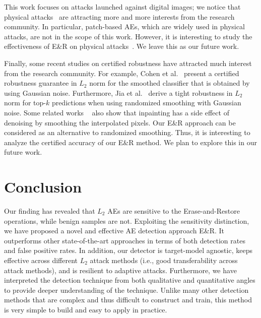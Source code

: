 \documentclass[sigconf]{acmart}
\begin{document}
This work focuses on attacks launched against digital images; we notice that physical attacks~\cite{eykholt2018robust, song2018physical} are attracting more and more interests from the research community. In particular, patch-based AEs, which are widely used in physical attacks, are not in the scope of this work. However, it is interesting to study the effectiveness of E\&R on  physical attacks~\cite{eykholt2018robust}. We leave this as our future work.

Finally, some recent studies on certified robustness have attracted much interest from the research community. For example, Cohen et al.~\cite{cohen2019certified} present 
a certified
robustness guarantee in $L_2$ norm for the smoothed classifier 
that is obtained by using Gaussian noise. Furthermore, Jia et al.~\cite{jia2019certified} derive a tight robustness in $L_2$ norm for top-$k$ predictions when using randomized smoothing with Gaussian noise. Some related works ~\cite{sanders2019inpainting, adam2017denoising} also show that inpainting has a side effect of denoising by smoothing the interpolated pixels. Our E\&R approach can be considered as an alternative to randomized smoothing. Thus, it is interesting to analyze the certified accuracy of our E\&R  method. We plan to explore this in our future work.

\vspace{-2pt}
\section{Conclusion}\label{sec:conclude}

Our finding has revealed 
that $L_2$ AEs are sensitive to 
the Erase-and-Restore
operations, while benign samples are not.
Exploiting the sensitivity distinction, we have proposed a novel and 
effective AE detection approach E\&R. It outperforms other state-of-the-art approaches in terms of 
both detection rates and false positive rates. In addition, our detector is target-model agnostic, keeps effective across different $L_2$ attack methods (i.e., good transferability across attack methods), and is resilient to adaptive attacks. 
Furthermore, we have interpreted the detection technique from both qualitative and quantitative angles to provide deeper understanding of the technique. {Unlike many
other detection methods that are complex and thus difficult to construct and train,
this method is very simple to build and easy to apply in practice.}
\end{document}
